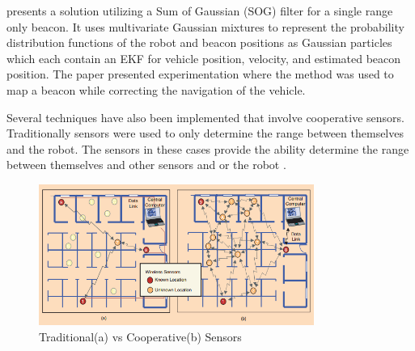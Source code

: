 \documentclass[conference]{IEEEtran}
\begin{document}
	
	
	
	
	
	
	
	
	
	
	
	
	
	
	\cite{Vallicrosa2015} presents a solution utilizing a Sum of Gaussian (SOG) filter for a single range only beacon. It uses multivariate Gaussian mixtures to represent the probability distribution functions of the robot and beacon positions as Gaussian particles which each contain an EKF for vehicle position, velocity, and estimated beacon position. The paper presented experimentation where the method was used to map a beacon while correcting the navigation of the vehicle. 
	
	
	
	Several techniques have also been implemented that involve cooperative sensors. Traditionally sensors were used to only determine the range between themselves and the robot. The sensors in these cases provide the ability determine the range between themselves and other sensors and or the robot \cite{Patwari2005}.
	
	\begin{figure}[h!]
		
		\centering
		
		\includegraphics[width=90mm]{coop_loc_comp_patwari.png}
		
		\caption{Traditional(a) vs Cooperative(b) Sensors \cite{Patwari2005}}
		
		\label{trad_vs_coop_sensors}
		
	\end{figure}
	
\end{document}

